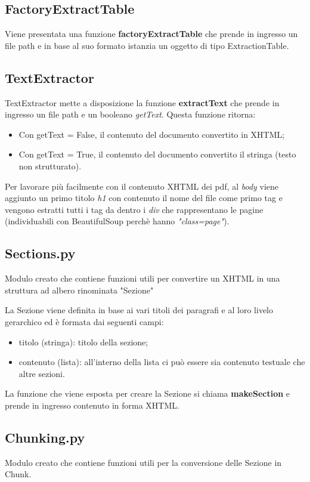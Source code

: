 \subsection{FactoryExtractTable}
Viene presentata una funzione \textbf{factoryExtractTable} che prende in ingresso un file path e in base al suo formato istanzia un oggetto di tipo ExtractionTable.

\subsection{TextExtractor}
TextExtractor mette a disposizione la funzione \textbf{extractText} che prende in ingresso un file path e un booleano \emph{getText}.
Questa funzione ritorna:
\begin{itemize}
    \item Con getText = False, il contenuto del documento convertito in XHTML;
    \item Con getText = True, il contenuto del documento convertito il stringa (testo non strutturato). 
\end{itemize}

Per lavorare più facilmente con il contenuto XHTML dei pdf, al \emph{body} viene aggiunto un primo titolo \emph{h1} con contenuto il nome del file come primo tag e vengono estratti tutti i tag da dentro i \emph{div} che rappresentano le pagine (individuabili con BeautifulSoup perchè hanno \emph{"class=page"}).

\subsection{Sections.py}
Modulo creato che contiene funzioni utili per convertire un XHTML in una struttura ad albero rinominata "Sezione"

La Sezione viene definita in base ai vari titoli dei paragrafi e al loro livelo gerarchico ed è formata dai seguenti campi:
\begin{itemize}
    \item titolo (stringa): titolo della sezione;
    \item contenuto (lista): all'interno della lista ci può essere sia contenuto testuale che altre sezioni. 
\end{itemize}

La funzione che viene esposta per creare la Sezione si chiama \textbf{makeSection} e prende in ingresso contenuto in forma XHTML.

\subsection{Chunking.py}
Modulo creato che contiene funzioni utili per la conversione delle Sezione in Chunk.

